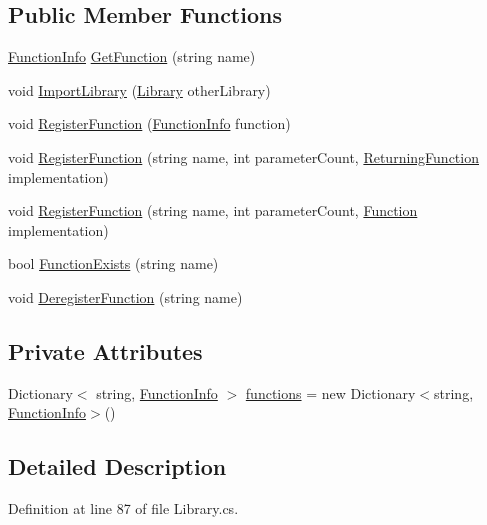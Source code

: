 \subsection*{Public Member Functions}
\begin{DoxyCompactItemize}
\item 
\hyperlink{a00100}{Function\-Info} \hyperlink{a00123_aacfb1f00ad8aa3921941b8d8af0960e0}{Get\-Function} (string name)
\item 
void \hyperlink{a00123_ab42a4fd30a72156cafa685f959deef78}{Import\-Library} (\hyperlink{a00123}{Library} other\-Library)
\item 
void \hyperlink{a00123_a001ab29d21fe7db10fc9c250914287f9}{Register\-Function} (\hyperlink{a00100}{Function\-Info} function)
\item 
void \hyperlink{a00123_a2a698de0b528b2bac17bd85f57d45d4b}{Register\-Function} (string name, int parameter\-Count, \hyperlink{a00045_a5177bf74fbfe7303fac9d8236c2e514b}{Returning\-Function} implementation)
\item 
void \hyperlink{a00123_a6820eaa082077f16496effbc9041b7ad}{Register\-Function} (string name, int parameter\-Count, \hyperlink{a00045_ae0be2e5cf13d5779816102439e61ff1a}{Function} implementation)
\item 
bool \hyperlink{a00123_a6c9a1cc3e25b6aae25e210d8a0d68c09}{Function\-Exists} (string name)
\item 
void \hyperlink{a00123_a47d1b3664733207d5cda15f4a4a7af7a}{Deregister\-Function} (string name)
\end{DoxyCompactItemize}
\subsection*{Private Attributes}
\begin{DoxyCompactItemize}
\item 
Dictionary$<$ string, \hyperlink{a00100}{Function\-Info} $>$ \hyperlink{a00123_a2fcc78a63963be5320cf09783b66fab6}{functions} = new Dictionary$<$string, \hyperlink{a00100}{Function\-Info}$>$()
\end{DoxyCompactItemize}


\subsection{Detailed Description}


Definition at line 87 of file Library.\-cs.



